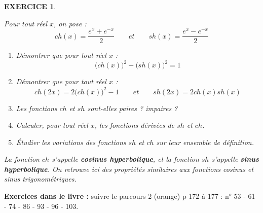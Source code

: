 \documentclass[a4paper]{article}   %
\renewcommand{\(}{\left(}
\renewcommand{\)}{\right)}
\newtheorem{EXO}{\large EXERCICE }
\newenvironment{EX}   { \setcounter{ques}{0} \begin{EXO} \hrulefill ~\vspace{0.3cm}

\normalfont}    {\end{EXO} \medskip}
\newcommand{\f}{\dfrac} 	%
\begin{document}
\begin{EX}
Pour tout réel $x$, on pose : 
$$ch(x)=\f{e^x+e^{-x}}{2} \qquad et \qquad sh(x)=\f{e^x-e^{-x}}{2}$$
\begin{enumerate}
\item Démontrer que pour tout réel $x$ :
$$\Big( ch(x) \Big)^2-\Big( sh(x) \Big)^2=1$$
\item Démontrer que pour tout réel $x$ :
$$ch(2x)=2\Big(ch(x)\Big)^2 -1 \qquad et \qquad sh(2x)=2ch(x)sh(x) $$
\item Les fonctions $ch$ et $sh$ sont-elles paires ? impaires ?
\vspace{0.1cm}
\item Calculer, pour tout réel $x$, les fonctions dérivées de $sh$ et $ch$. 
\vspace{0.1cm}
\item \'Etudier les variations des fonctions $sh$ et $ch$ sur leur ensemble de définition.\\ 
\end{enumerate} 
\vspace{0.2cm}

La fonction $ch$ s'appelle \textbf{cosinus hyperbolique}, et la fonction $sh$ s'appelle \textbf{sinus hyperbolique}. On retrouve ici des propriétés similaires aux fonctions cosinus et sinus trigonométriques. 
\end{EX}
\bigskip

\textbf{Exercices dans le livre :} suivre le parcours 2 (orange) p 172 à 177 : n° 53 - 61 - 74 - 86 - 93 - 96 - 103. 
\end{document}
